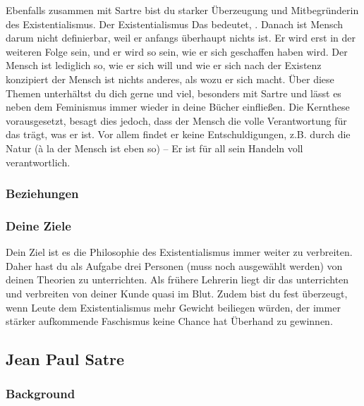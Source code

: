 \documentclass[12pt, a4paper, openany]{report}
\begin{document}
Ebenfalls zusammen mit Sartre bist du starker Überzeugung und Mitbegründerin des Existentialismus. Der Existentialismus  Das bedeutet, . Danach ist Mensch darum nicht definierbar, weil er anfangs überhaupt nichts ist. Er wird erst in der weiteren Folge sein, und er wird so sein, wie er sich geschaffen haben wird. Der Mensch ist lediglich so, wie er sich will und wie er sich nach der Existenz konzipiert der Mensch ist nichts anderes, als wozu er sich macht. Über diese Themen unterhältst du dich gerne und viel, besonders mit Sartre und lässt es neben dem Feminismus immer wieder in deine Bücher einfließen. Die Kernthese vorausgesetzt, besagt dies jedoch, dass der Mensch die volle Verantwortung für das trägt, was er ist. Vor allem findet er keine Entschuldigungen, z.B. durch die Natur (à la der Mensch ist eben so) – Er ist für all sein Handeln voll verantwortlich. 




\subsubsection{Beziehungen}

\subsubsection{Deine Ziele}

Dein Ziel ist es die Philosophie des Existentialismus immer weiter zu verbreiten. Daher hast du als Aufgabe drei Personen (muss noch ausgewählt werden) von deinen Theorien zu unterrichten. Als frühere Lehrerin liegt dir das unterrichten und verbreiten von deiner Kunde quasi im Blut. Zudem bist du fest überzeugt, wenn Leute dem Existentialismus mehr Gewicht beiliegen würden, der immer stärker aufkommende Faschismus keine Chance hat Überhand zu gewinnen.

\subsection{Jean Paul Satre}
\subsubsection{Background}
\end{document}
